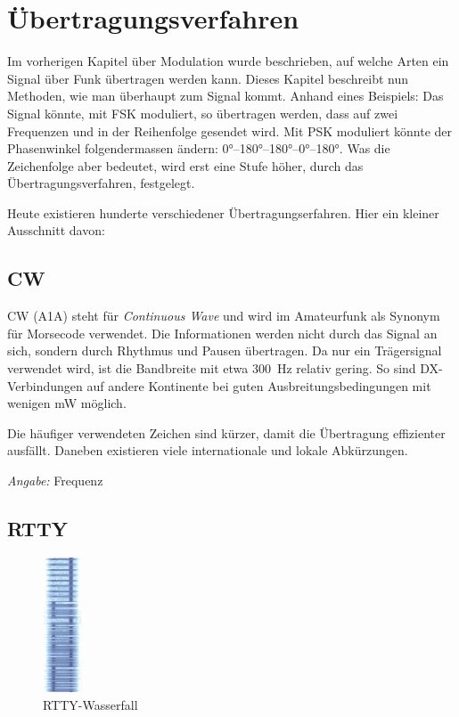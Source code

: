 \chapter{Übertragungsverfahren}\label{sec:uebertr}
Im vorherigen Kapitel über Modulation wurde beschrieben, auf welche Arten ein Signal über Funk übertragen werden kann. Dieses Kapitel beschreibt nun Methoden, wie man überhaupt zum Signal kommt. Anhand eines Beispiels: Das Signal  könnte, mit FSK moduliert, so übertragen werden, dass auf zwei Frequenzen  und  in der Reihenfolge  gesendet wird. Mit PSK moduliert könnte der Phasenwinkel folgendermassen ändern: 0°--180°--180°--0°--180°. Was die Zeichenfolge  aber bedeutet, wird erst eine Stufe höher, durch das Übertragungsverfahren, festgelegt.

Heute existieren hunderte verschiedener Übertragungserfahren. Hier ein kleiner Ausschnitt davon:

\section{CW}
CW (A1A) steht für \textit{Continuous Wave} und wird im Amateurfunk als Synonym für Morsecode verwendet. Die Informationen werden nicht durch das Signal an sich, sondern durch Rhythmus und Pausen übertragen. Da nur ein Trägersignal verwendet wird, ist die Bandbreite mit etwa 300 Hz relativ gering. So sind DX-Verbindungen auf andere Kontinente bei guten Ausbreitungsbedingungen mit wenigen mW möglich.

Die häufiger verwendeten Zeichen sind kürzer, damit die Übertragung effizienter ausfällt. Daneben existieren viele internationale und lokale Abkürzungen.

\textit{Angabe:} Frequenz

\section{RTTY}
\begin{figure}
 \centering
 \includegraphics[height=4cm]{png/RTTY-BaudlineSmall.png}
 \caption{RTTY-Wasserfall}
 \label{fig:rttyWaterfall}
\end{figure}

